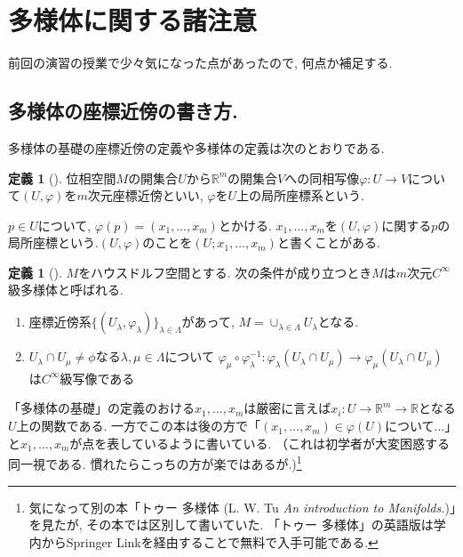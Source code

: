 \documentclass[dvipdfmx,a4paper,11pt]{article}
\newcommand{\R}{\mathbb{R}}
\theoremstyle{definition}
\newtheorem{dfn}[thm]{定義}
\begin{document}
\section{多様体に関する諸注意}
前回の演習の授業で少々気になった点があったので, 何点か補足する.

\subsection{多様体の座標近傍の書き方.}

多様体の基礎の座標近傍の定義や多様体の定義は次のとおりである.
\begin{tcolorbox}[
    colback = white,
    colframe = green!35!black,
    fonttitle = \bfseries,
    breakable = true]
    \begin{dfn}[]
    \label{defn_local}
    位相空間$M$の開集合$U$から$\R^m$の開集合$V$への同相写像$\varphi : U \rightarrow V$について$(U, \varphi)$を$m$次元座標近傍といい, $\varphi$を$U$上の局所座標系という. 
    
    $p \in U$について, $\varphi(p) =(x_1, \ldots, x_m)$とかける. $x_1, \ldots, x_m$を$(U, \varphi)$に関する$p$の局所座標という.$(U, \varphi)$のことを$(U; x_1, \ldots, x_m)$と書くことがある. 
    \end{dfn}
    \end{tcolorbox}
    \begin{tcolorbox}[
    colback = white,
    colframe = green!35!black,
    fonttitle = \bfseries,
    breakable = true]
    \begin{dfn}[]
    $M$をハウスドルフ空間とする. 次の条件が成り立つとき$M$は$m$次元$C^{\infty}$級多様体と呼ばれる.
     \begin{enumerate}
     \setlength{\parskip}{0cm}
  \setlength{\itemsep}{2pt} 
     \item 座標近傍系$\{(U_\lambda, \varphi_\lambda)\}_{\lambda \in\Lambda}$があって, $M = \cup_{\lambda \in \Lambda} U_{\lambda}$となる. 
     \item $U_\lambda \cap U_\mu \neq \phi$なる$\lambda, \mu \in \Lambda$について
    $
   \varphi_\mu\circ \varphi_{\lambda}^{-1} : \varphi_{\lambda}(U_\lambda \cap U_\mu) \rightarrow \varphi_{\mu}(U_\lambda \cap U_\mu) 
    $
    は$C^{\infty}$級写像である
     \end{enumerate}


    \end{dfn}
    \end{tcolorbox}   
    
「多様体の基礎」の定義のおける$ x_1, \ldots, x_m$は厳密に言えば$x_i : U \rightarrow \R^m \rightarrow \R$となる$U$上の関数である. 一方でこの本は後の方で「$(x_1, \ldots, x_m) \in \varphi(U)$について...」と$ x_1, \ldots, x_m$が点を表しているように書いている. （これは初学者が大変困惑する同一視である. 慣れたらこっちの方が楽ではあるが.)\footnote{気になって別の本「トゥー 多様体 (L. W. Tu \textit{An introduction to Manifolds.})」を見たが, その本では区別して書いていた. 「トゥー 多様体」の英語版は学内からSpringer Linkを経由することで無料で入手可能である.} 
\end{document}
